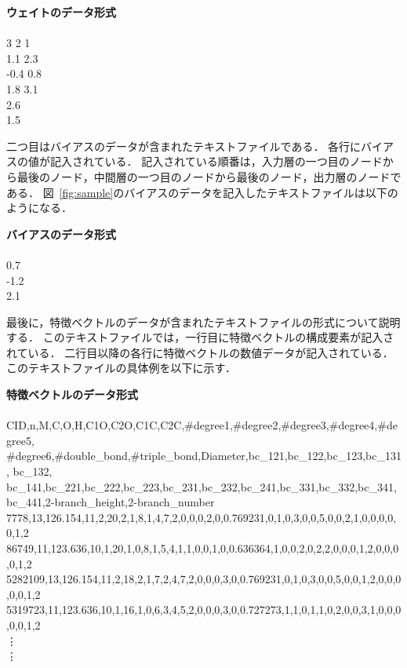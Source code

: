 \documentclass[11pt,titlepage,dvipdfmx,twoside]{jarticle}
\begin{document}
\bigskip

\begin{oframed}
{\bf ウェイトのデータ形式}\\\\
3 2 1\\
1.1 2.3\\
-0.4 0.8\\
1.8 3.1\\
2.6\\
1.5\\
\end{oframed}

\bigskip

二つ目はバイアスのデータが含まれたテキストファイルである．
各行にバイアスの値が記入されている．
記入されている順番は，入力層の一つ目のノードから最後のノード，中間層の一つ目のノードから最後のノード，出力層のノードである．
図~\ref{fig:sample}のバイアスのデータを記入したテキストファイルは以下のようになる．

\bigskip

\begin{oframed}
{\bf バイアスのデータ形式}\\\\
0.7\\
-1.2\\
2.1\\
\end{oframed}

\bigskip

最後に，特徴ベクトルのデータが含まれたテキストファイルの形式について説明する．
このテキストファイルでは，一行目に特徴ベクトルの構成要素が記入されている．
二行目以降の各行に特徴ベクトルの数値データが記入されている．
このテキストファイルの具体例を以下に示す．

\bigskip

\begin{oframed}
{\bf 特徴ベクトルのデータ形式}\\\\
CID,n,M,C,O,H,C1O,C2O,C1C,C2C,\#degree1,\#degree2,\#degree3,\#degree4,\#degree5,\\
\#degree6,\#double\_bond,\#triple\_bond,Diameter,bc\_121,bc\_122,bc\_123,bc\_131,
bc\_132, \\bc\_141,bc\_221,bc\_222,bc\_223,bc\_231,bc\_232,bc\_241,bc\_331,bc\_332,bc\_341,bc\_441,2-branch\_height,2-branch\_number\\
7778,13,126.154,11,2,20,2,1,8,1,4,7,2,0,0,0,2,0,0.769231,0,1,0,3,0,0,5,0,0,2,1,0,0,0,0,0,1,2
\\
86749,11,123.636,10,1,20,1,0,8,1,5,4,1,1,0,0,1,0,0.636364,1,0,0,2,0,2,2,0,0,0,1,2,0,0,0,0,1,2
\\
5282109,13,126.154,11,2,18,2,1,7,2,4,7,2,0,0,0,3,0,0.769231,0,1,0,3,0,0,5,0,0,1,2,0,0,0,0,0,1,2
\\
5319723,11,123.636,10,1,16,1,0,6,3,4,5,2,0,0,0,3,0,0.727273,1,1,0,1,1,0,2,0,0,3,1,0,0,0,0,0,1,2
\\
\hspace{5mm}\vdots
\\
\hspace{5mm}\vdots

\end{oframed}
\end{document}
